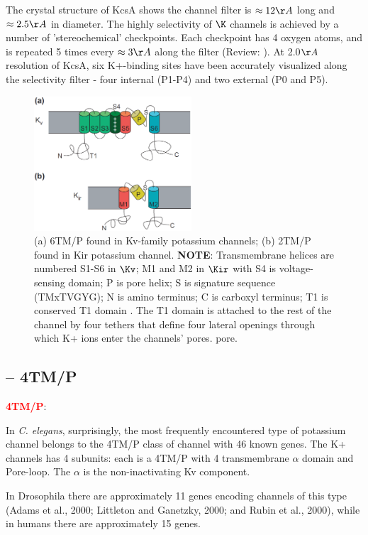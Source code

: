 The crystal structure of KcsA shows the channel filter is $\approx 12\AA$ long
and $\approx2.5\AA$ in diameter. The highly selectivity of $\K$ channels is
achieved by a number of 'stereochemical' checkpoints. Each checkpoint has 4
oxygen atoms, and is repeated 5 times every $\approx 3\AA$ along the filter
(Review: \citep{choe2002pcs}). At 2.0$\AA$ resolution of KcsA, six K+-binding
sites have been accurately visualized along the selectivity filter - four
internal (P1-P4) and two external (P0 and P5).

\begin{figure}[hbt]
  \centerline{\includegraphics[height=5cm,
    angle=0]{./images/K_channels.eps}}
  \caption{(a) 6TM/P found in Kv-family potassium channels; (b) 2TM/P found in
  Kir potassium channel. {\bf NOTE}:
  Transmembrane helices are numbered S1-S6 in $\Kv$; M1 and M2 in $\Kir$ with S4
  is voltage-sensing domain; P is pore helix; S is signature sequence
  (TMxTVGYG); N is amino terminus; C is carboxyl terminus; T1 is conserved T1
  domain \citep{Miller2000}. The T1 domain is attached to the rest of the
  channel by four tethers that define four lateral openings through which K+
  ions enter the channels' pores.
pore.}
\label{fig:K_channel}
\end{figure}


\subsection{-- 4TM/P}
\label{sec:4TM/P}

\textcolor{red}{\bf 4TM/P}:

In {\it C. elegans}, surprisingly, the most frequently encountered type of
potassium channel belongs to the 4TM/P class of channel with 46 known genes.
The K+ channels has 4 subunits: each is a 4TM/P with 4 transmembrane $\alpha$
domain and Pore-loop. The $\alpha$ is the non-inactivating Kv component.

In Drosophila there are approximately 11 genes encoding channels of this
type (Adams et al., 2000; Littleton and Ganetzky, 2000; and Rubin et al., 2000),
while in humans there are approximately 15 genes.


